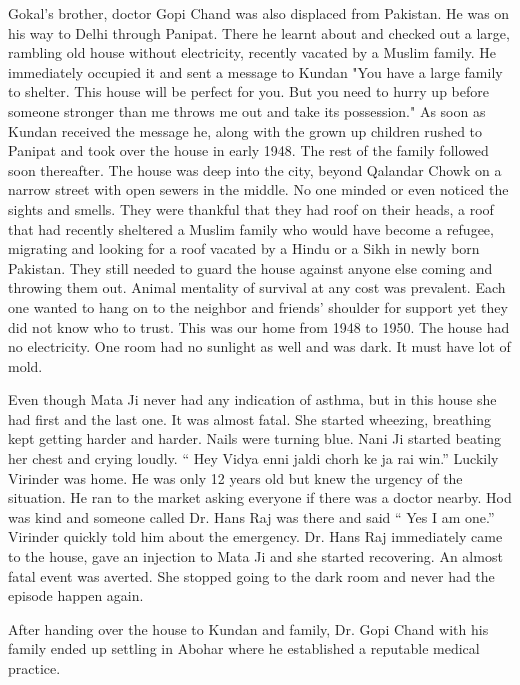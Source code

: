 Gokal's brother, doctor Gopi Chand was also displaced from Pakistan. He was on his way to Delhi through Panipat. There he learnt about and checked out a large, rambling old house without electricity, recently vacated by a Muslim family. He immediately occupied it and sent a message to Kundan "You have a large family to shelter. This house will be perfect for you. But you need to hurry up before someone stronger than me throws me out and take its possession." As soon as Kundan received the message he, along with the grown up children rushed to Panipat and took over the house in early 1948. The rest of the family followed soon thereafter. The house was deep into the city, beyond Qalandar Chowk on a  narrow street with open sewers in the middle.  No one minded or even noticed the sights and smells. They were thankful that they had roof on their heads, a roof that had recently sheltered a Muslim family who would have become a refugee, migrating and looking for a roof vacated by a Hindu or a Sikh in newly born Pakistan. They still needed to guard the house against anyone else coming and throwing them out. Animal mentality of survival at any cost was prevalent. Each one wanted to hang on to the neighbor and friends’ shoulder for support yet they did not know who to trust. This was our home from 1948 to 1950. The house had no electricity. One room had no sunlight as well and was dark. It must have lot of mold. 

Even though Mata Ji never had any indication of asthma, but in this house she had first and the last one. It was almost fatal. She started wheezing, breathing kept getting harder and harder. Nails were turning blue. Nani Ji started beating her chest and crying loudly. “ Hey Vidya enni jaldi chorh ke ja rai win.” Luckily Virinder was home. He was only 12 years old but knew the urgency of the situation. He ran to the market asking everyone if there was a doctor nearby. Hod was kind and someone called Dr. Hans Raj was there and said “ Yes I am one.” Virinder quickly told him about the emergency. Dr. Hans Raj immediately came to the house, gave an injection to Mata Ji and she started recovering. An almost fatal event was averted. She stopped going to the dark room and never had the episode happen again. 


After handing over the house to Kundan and family,  Dr. Gopi Chand with his family ended up settling in Abohar where he established a reputable medical practice. 

